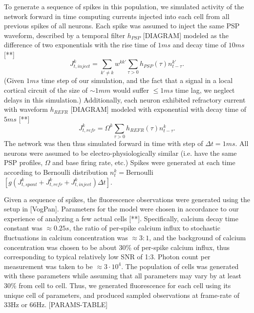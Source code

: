 To generate a sequence of spikes in this population, we simulated activity of the network forward in time computing currents injected into each cell from all previous spikes of all neurons. Each spike was assumed to inject the same PSP waveform, described by a temporal filter $h_{PSP}$ [DIAGRAM] modeled as the difference of two exponentials with the rise time of $1ms$ and decay time of $10ms$ [**]
\begin{equation}
J^k_{t, inject} = \sum_{k'\neq k}w^{kk'}\sum_{\tau>0}
h_{PSP}(\tau) n^{k'}_{t-\tau}.
\end{equation}
(Given $1ms$ time step of our simulation, and the fact that
a signal in a local cortical circuit of the size of $\sim 1mm$
would suffer $\leq 1ms$ time lag, we neglect delays
in this simulation.) Additionally, each neuron exhibited refractory current with waveform $h_{REFR}$ [DIAGRAM] modeled with exponential with decay time of $5ms$ [**]
\begin{equation}
J^k_{t,{refr}} = \Omega^k \sum_{\tau>0}h_{REFR}(\tau) n^{k}_{t-\tau}.
\end{equation}
The network was then thus simulated forward in time with step of $\Delta t=1ms$. All neurons were assumed to be electro-physiologically similar (i.e. have the same PSP profiles, $\Omega$ and base firing rate, etc.) Spikes were generated at each time according to Bernoulli distribution
$n^k_t=$Bernoulli$[g(J^k_{t,spont}+J^k_{t,refr}+J^k_{t,inject})\Delta t]$.

Given a sequence of spikes, the fluorescence observations were generated using the setup in [VogPan]. Parameters for the model were chosen in accordance to our experience of analyzing a few actual cells [**]. Specifically, calcium decay time constant was $\approx 0.25 s$, the ratio of per-spike calcium influx to stochastic fluctuations in calcium concentration was $\approx3:1$,
and the background of calcium concentration was chosen to be about 30\% of per-spike calcium influx, thus corresponding to typical relatively low SNR of 1:3. Photon count per measurement was taken to be $\approx 3\cdot 10^4$. The population of cells was generated with these parameters while assuming that all parameters may vary by at least 30\% from cell to cell. Thus, we generated fluorescence for each cell using its unique cell of parameters, and produced sampled observations at frame-rate of 33Hz or 66Hz. [PARAMS-TABLE]